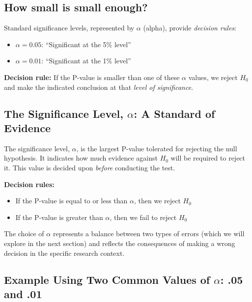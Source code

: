 \documentclass[
  letterpaper,
  DIV=11,
  numbers=noendperiod]{scrreprt}
\providecommand{\tightlist}{%
  \setlength{\itemsep}{0pt}\setlength{\parskip}{0pt}}
\begin{document}
\subsection{How small is small enough?}\label{how-small-is-small-enough}

Standard significance levels, represented by \(\alpha\) (alpha), provide
\emph{decision rules}:

\begin{itemize}
\tightlist
\item
  \(\alpha = 0.05\): ``Significant at the 5\% level''
\item
  \(\alpha = 0.01\): ``Significant at the 1\% level''
\end{itemize}

\textbf{Decision rule:} If the P-value is smaller than one of these
\(\alpha\) values, we reject \(H_0\) and make the indicated conclusion
at that \emph{level of significance}.

\subsection{\texorpdfstring{The Significance Level, \(\alpha\): A
Standard of
Evidence}{The Significance Level, \textbackslash alpha: A Standard of Evidence}}\label{the-significance-level-alpha-a-standard-of-evidence}

The significance level, \(\alpha\), is the largest P-value tolerated for
rejecting the null hypothesis. It indicates how much evidence against
\(H_0\) will be required to reject it. This value is decided upon
\emph{before} conducting the test.

\textbf{Decision rules:}

\begin{itemize}
\item
  If the P-value is equal to or less than \(\alpha\), then we reject
  \(H_0\)
\item
  If the P-value is greater than \(\alpha\), then we fail to reject
  \(H_0\)
\end{itemize}

The choice of \(\alpha\) represents a balance between two types of
errors (which we will explore in the next section) and reflects the
consequences of making a wrong decision in the specific research
context.

\subsection{\texorpdfstring{Example Using Two Common Values of
\(\alpha\): .05 and
.01}{Example Using Two Common Values of \textbackslash alpha: .05 and .01}}\label{example-using-two-common-values-of-alpha-.05-and-.01}
\end{document}
